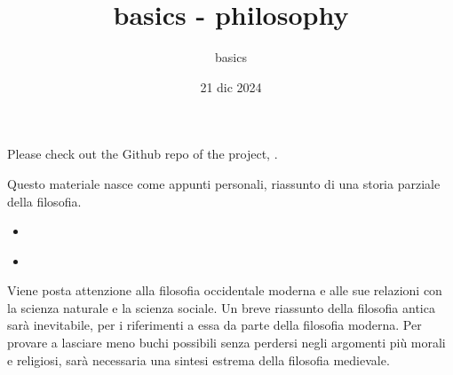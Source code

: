 \documentclass[letterpaper,10pt,italian]{jupyterBook}
\title{basics - philosophy}
\date{21 dic 2024}
\author{basics}
\begin{document}
\pagestyle{empty}
\sphinxmaketitle
\pagestyle{plain}
\sphinxtableofcontents
\pagestyle{normal}
\label{\detokenize{intro::doc}}


\sphinxAtStartPar
Please check out the Github repo of the project, .

\sphinxAtStartPar
Questo materiale nasce come appunti personali, riassunto di una storia parziale della filosofia.
\begin{itemize}
\item {} 
\sphinxAtStartPar
{\hyperref[\detokenize{ch/history::doc}]{}}

\item {} 
\sphinxAtStartPar
{\hyperref[\detokenize{ch/topics::doc}]{}}

\end{itemize}

\sphinxAtStartPar
Viene posta attenzione alla filosofia occidentale moderna e alle sue relazioni con la scienza naturale e la scienza sociale. Un breve riassunto della filosofia antica sarà inevitabile, per i riferimenti a essa da parte della filosofia moderna. Per provare a lasciare meno buchi possibili senza perdersi negli argomenti più morali e religiosi, sarà necessaria una sintesi estrema della filosofia medievale.

\sphinxstepscope
\end{document}
